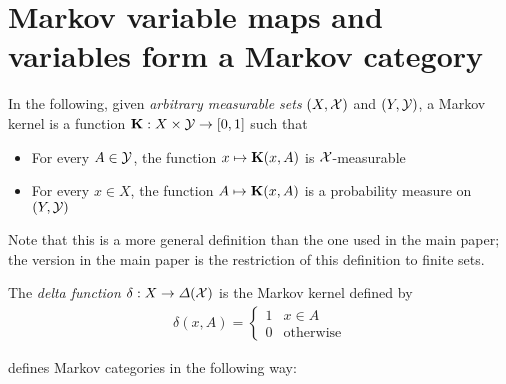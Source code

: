 \section{Markov variable maps and variables form a Markov category}\label{sec:app_mcat}

In the following, given \emph{arbitrary measurable sets} $(X,\mathcal{X})$ and $(Y,\mathcal{Y})$, a Markov kernel is a function $\mathbf{K}:X\times\mathcal{Y}\to [0,1]$ such that

\begin{itemize}
    \item For every $A\in \mathcal{Y}$, the function $x\mapsto \mathbf{K}(x,A)$ is $\mathcal{X}$-measurable
    \item For every $x\in X$, the function $A\mapsto \mathbf{K}(x,A)$ is a probability measure on $(Y,\mathcal{Y})$
\end{itemize}

Note that this is a more general definition than the one used in the main paper; the version in the main paper is the restriction of this definition to finite sets.

The \emph{delta function} $\delta:X\to\Delta(\mathcal{X})$ is the Markov kernel defined by
\begin{align}
    \delta(x,A) = \begin{cases}
        1 & x\in A\\
        0 & \text{otherwise}
    \end{cases}
\end{align}

\citet{fritz_synthetic_2020} defines Markov categories in the following way:

